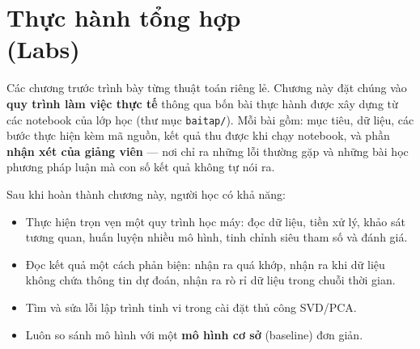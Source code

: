 
\chapter{Thực hành tổng hợp \\ (Labs)}
\label{chap:labs}

Các chương trước trình bày từng thuật toán riêng lẻ. Chương này đặt chúng vào \textbf{quy trình làm việc thực tế} thông qua bốn bài thực hành được xây dựng từ các notebook của lớp học (thư mục \texttt{baitap/}). Mỗi bài gồm: mục tiêu, dữ liệu, các bước thực hiện kèm mã nguồn, kết quả thu được khi chạy notebook, và phần \textbf{nhận xét của giảng viên} --- nơi chỉ ra những lỗi thường gặp và những bài học phương pháp luận mà con số kết quả không tự nói ra.

\noindent Sau khi hoàn thành chương này, người học có khả năng:
\begin{itemize}
    \item Thực hiện trọn vẹn một quy trình học máy: đọc dữ liệu, tiền xử lý, khảo sát tương quan, huấn luyện nhiều mô hình, tinh chỉnh siêu tham số và đánh giá.
    \item Đọc kết quả một cách phản biện: nhận ra quá khớp, nhận ra khi dữ liệu không chứa thông tin dự đoán, nhận ra rò rỉ dữ liệu trong chuỗi thời gian.
    \item Tìm và sửa lỗi lập trình tinh vi trong cài đặt thủ công SVD/PCA.
    \item Luôn so sánh mô hình với một \textbf{mô hình cơ sở} (baseline) đơn giản.
\end{itemize}

